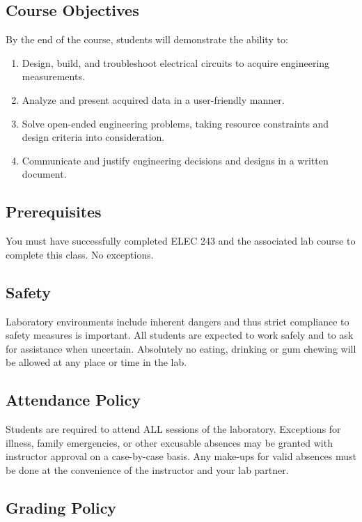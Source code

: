 \documentclass{article}
\begin{document}
\subsection*{Course Objectives}
By the end of the course, students will demonstrate the ability to:

\begin{enumerate}
	\item Design, build, and troubleshoot electrical circuits to acquire engineering measurements.
	\item Analyze and present acquired data in a user-friendly manner.
	\item Solve open-ended engineering problems, taking resource constraints and design criteria into consideration.
	\item Communicate and justify engineering decisions and designs in a written document.
\end{enumerate}

\subsection*{Prerequisites}
You must have successfully completed ELEC 243 and the associated lab course to complete this class. No exceptions.

\subsection*{Safety}
Laboratory environments include inherent dangers and thus strict compliance to safety measures is important. All students are expected to work safely and to ask for assistance when uncertain. Absolutely no eating, drinking or gum chewing will be allowed at any place or time in the lab.

\subsection*{Attendance Policy}
Students are required to attend ALL sessions of the laboratory. Exceptions for illness, family emergencies, or other excusable absences may be granted with instructor approval on a case-by-case basis. Any make-ups for valid absences must be done at the convenience of the instructor and your lab partner.

\subsection*{Grading Policy}
\end{document}
